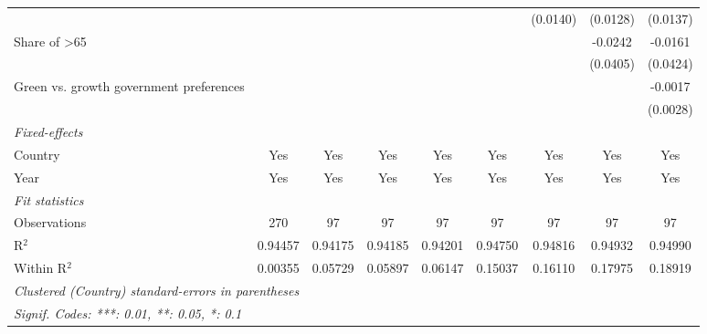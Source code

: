 \begin{table}[htbp]
\begin{tabular}{lcccccccc}
                                                            &          &               &          &          &          & (0.0140) & (0.0128) & (0.0137)\\   
      Share of >65                                          &          &               &          &          &          &          & -0.0242  & -0.0161\\   
                                                            &          &               &          &          &          &          & (0.0405) & (0.0424)\\   
      Green vs. growth government preferences               &          &               &          &          &          &          &          & -0.0017\\   
                                                            &          &               &          &          &          &          &          & (0.0028)\\   
      \midrule
      \emph{Fixed-effects}\\
      Country                                               & Yes      & Yes           & Yes      & Yes      & Yes      & Yes      & Yes      & Yes\\  
      Year                                                  & Yes      & Yes           & Yes      & Yes      & Yes      & Yes      & Yes      & Yes\\  
      \midrule
      \emph{Fit statistics}\\
      Observations                                          & 270      & 97            & 97       & 97       & 97       & 97       & 97       & 97\\  
      R$^2$                                                 & 0.94457  & 0.94175       & 0.94185  & 0.94201  & 0.94750  & 0.94816  & 0.94932  & 0.94990\\  
      Within R$^2$                                          & 0.00355  & 0.05729       & 0.05897  & 0.06147  & 0.15037  & 0.16110  & 0.17975  & 0.18919\\  
      \midrule \midrule
      \multicolumn{9}{l}{\emph{Clustered (Country) standard-errors in parentheses}}\\
      \multicolumn{9}{l}{\emph{Signif. Codes: ***: 0.01, **: 0.05, *: 0.1}}\\
   \end{tabular}
\end{table}


